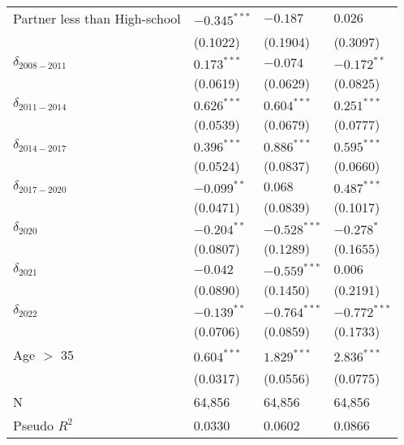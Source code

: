 \begin{tabular}{llll}
Partner less than High-school &     $-0.345^{***}$ &           $-0.187$ &            $0.026$ \\
                              &           (0.1022) &           (0.1904) &           (0.3097) \\
$\delta_{2008-2011}$          &      $0.173^{***}$ &           $-0.074$ &      $-0.172^{**}$ \\
                              &           (0.0619) &           (0.0629) &           (0.0825) \\
$\delta_{2011-2014}$          &      $0.626^{***}$ &      $0.604^{***}$ &      $0.251^{***}$ \\
                              &           (0.0539) &           (0.0679) &           (0.0777) \\
$\delta_{2014-2017}$          &      $0.396^{***}$ &      $0.886^{***}$ &      $0.595^{***}$ \\
                              &           (0.0524) &           (0.0837) &           (0.0660) \\
$\delta_{2017-2020}$          &      $-0.099^{**}$ &            $0.068$ &      $0.487^{***}$ \\
                              &           (0.0471) &           (0.0839) &           (0.1017) \\
$\delta_{2020}$               &      $-0.204^{**}$ &     $-0.528^{***}$ &         $-0.278^*$ \\
                              &           (0.0807) &           (0.1289) &           (0.1655) \\
$\delta_{2021}$               &           $-0.042$ &     $-0.559^{***}$ &            $0.006$ \\
                              &           (0.0890) &           (0.1450) &           (0.2191) \\
$\delta_{2022}$               &      $-0.139^{**}$ &     $-0.764^{***}$ &     $-0.772^{***}$ \\
                              &           (0.0706) &           (0.0859) &           (0.1733) \\
Age $>$ 35                    &      $0.604^{***}$ &      $1.829^{***}$ &      $2.836^{***}$ \\
                              &           (0.0317) &           (0.0556) &           (0.0775) \\
N                             &             64,856 &             64,856 &             64,856 \\
Pseudo $R^2$                  &             0.0330 &             0.0602 &             0.0866 \\
\bottomrule
\end{tabular}
